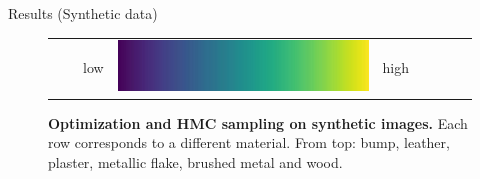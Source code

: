 \documentclass[final]{beamer}
\newlength{\twocolwid}
\newlength{\resultwidth}
\begin{document}
\begin{frame}[t]
\begin{columns}[t]
\begin{column}{\twocolwid}
\begin{block}{Results (Synthetic data)}
\begin{figure}[t]
\begin{tabular}{ccrclcccc}
            		& & low &
            		\includegraphics[width=\resultwidth]{other/colorbar.jpg} &
            		high & & &
            	\end{tabular}
            	\caption{\label{fig:synth}
            		\textbf{Optimization and HMC sampling on synthetic images.} Each row corresponds to a different material. From top: bump, leather, plaster, metallic flake, brushed metal and wood.
            	}
            \end{figure}
        \end{block}
    \end{column}
    

\end{columns}
\end{frame}
\end{document}
